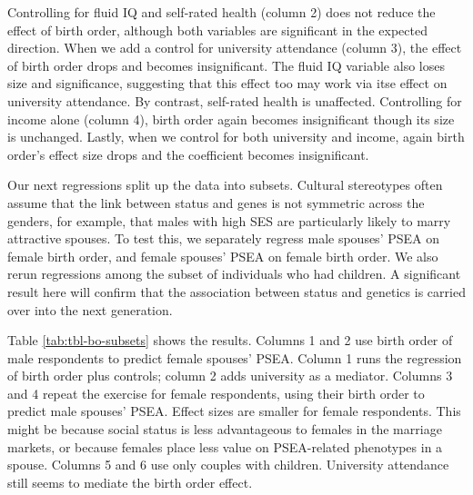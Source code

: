 \documentclass[
]{article}
\begin{document}
Controlling for fluid IQ and self-rated health (column 2) does not
reduce the effect of birth order, although both variables are
significant in the expected direction. When we add a control for
university attendance (column 3), the effect of birth order drops and
becomes insignificant. The fluid IQ variable also loses size and
significance, suggesting that this effect too may work via itse effect
on university attendance. By contrast, self-rated health is unaffected.
Controlling for income alone (column 4), birth order again becomes
insignificant though its size is unchanged. Lastly, when we control for
both university and income, again birth order's effect size drops and
the coefficient becomes insignificant.

Our next regressions split up the data into subsets. Cultural
stereotypes often assume that the link between status and genes is not
symmetric across the genders, for example, that males with high SES are
particularly likely to marry attractive spouses. To test this, we
separately regress male spouses' PSEA on female birth order, and female
spouses' PSEA on female birth order. We also rerun regressions among the
subset of individuals who had children. A significant result here will
confirm that the association between status and genetics is carried over
into the next generation.

Table \ref{tab:tbl-bo-subsets} shows the results. Columns 1 and 2 use
birth order of male respondents to predict female spouses' PSEA. Column
1 runs the regression of birth order plus controls; column 2 adds
university as a mediator. Columns 3 and 4 repeat the exercise for female
respondents, using their birth order to predict male spouses' PSEA.
Effect sizes are smaller for female respondents. This might be because
social status is less advantageous to females in the marriage markets,
or because females place less value on PSEA-related phenotypes in a
spouse. Columns 5 and 6 use only couples with children. University
attendance still seems to mediate the birth order effect.

 
  \providecommand{\huxb}[2]{\arrayrulecolor[RGB]{#1}\global\arrayrulewidth=#2pt}
  \providecommand{\huxvb}[2]{\color[RGB]{#1}\vrule width #2pt}
  \providecommand{\huxtpad}[1]{\rule{0pt}{#1}}
  \providecommand{\huxbpad}[1]{\rule[-#1]{0pt}{#1}}
\end{document}
